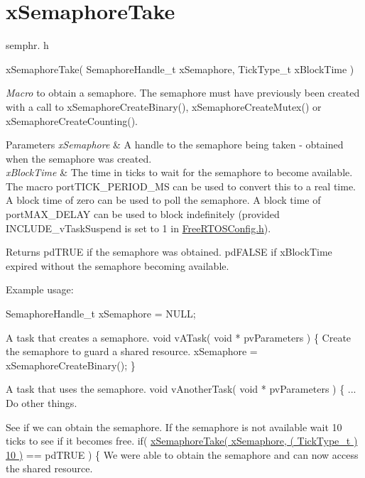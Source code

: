 \hypertarget{group__xSemaphoreTake}{\section{x\-Semaphore\-Take}
\label{group__xSemaphoreTake}
}
semphr. h 
\begin{DoxyPre}xSemaphoreTake(
                     SemaphoreHandle\_t xSemaphore,
                     TickType\_t xBlockTime
                 )\end{DoxyPre}


{\itshape Macro} to obtain a semaphore. The semaphore must have previously been created with a call to x\-Semaphore\-Create\-Binary(), x\-Semaphore\-Create\-Mutex() or x\-Semaphore\-Create\-Counting().


\begin{DoxyParams}{Parameters}
{\em x\-Semaphore} & A handle to the semaphore being taken -\/ obtained when the semaphore was created.\\
\hline
{\em x\-Block\-Time} & The time in ticks to wait for the semaphore to become available. The macro port\-T\-I\-C\-K\-\_\-\-P\-E\-R\-I\-O\-D\-\_\-\-M\-S can be used to convert this to a real time. A block time of zero can be used to poll the semaphore. A block time of port\-M\-A\-X\-\_\-\-D\-E\-L\-A\-Y can be used to block indefinitely (provided I\-N\-C\-L\-U\-D\-E\-\_\-v\-Task\-Suspend is set to 1 in \hyperlink{FreeRTOSConfig_8h}{Free\-R\-T\-O\-S\-Config.\-h}).\\
\hline
\end{DoxyParams}
\begin{DoxyReturn}{Returns}
pd\-T\-R\-U\-E if the semaphore was obtained. pd\-F\-A\-L\-S\-E if x\-Block\-Time expired without the semaphore becoming available.
\end{DoxyReturn}
Example usage\-: 
\begin{DoxyPre}
 SemaphoreHandle\_t xSemaphore = NULL;\end{DoxyPre}



\begin{DoxyPre}A task that creates a semaphore.
 void vATask( void * pvParameters )
 \{
Create the semaphore to guard a shared resource.
    xSemaphore = xSemaphoreCreateBinary();
 \}\end{DoxyPre}



\begin{DoxyPre}A task that uses the semaphore.
 void vAnotherTask( void * pvParameters )
 \{
... Do other things.
\begin{DoxyVerb}if( xSemaphore != NULL )
{
\end{DoxyVerb}

See if we can obtain the semaphore.  If the semaphore is not available
wait 10 ticks to see if it becomes free.
        if( \hyperlink{semphr_8h_af116e436d2a5ae5bd72dbade2b5ea930}{xSemaphoreTake( xSemaphore, ( TickType\_t ) 10 )} == pdTRUE )
        \{
We were able to obtain the semaphore and can now access the
shared resource.\end{DoxyPre}



